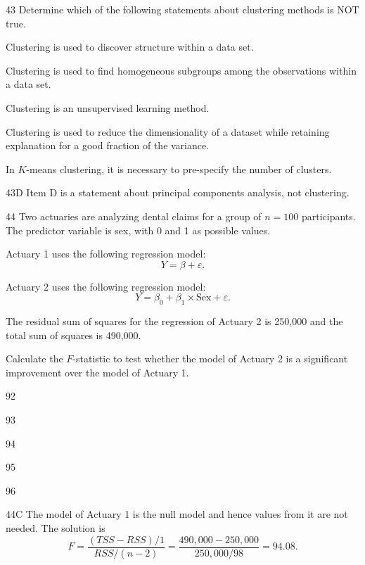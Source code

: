 \begin{question}{43}
Determine which of the following statements about clustering methods is NOT true.

\begin{choices}
\item Clustering is used to discover structure within a data set.
\item Clustering is used to find homogeneous subgroups among the observations within a data set.
\item Clustering is an unsupervised learning method.
\item Clustering is used to reduce the dimensionality of a dataset while retaining explanation for a good fraction of the variance.
\item In $K$-means clustering, it is necessary to pre-specify the number of clusters.
\end{choices}
\end{question}
\begin{solution}{43}{D}
Item D is a statement about principal components analysis, not clustering.
\end{solution}

\begin{question}{44}
Two actuaries are analyzing dental claims for a group of $n = 100$ participants. The predictor variable is sex, with 0 and 1 as possible values.

Actuary 1 uses the following regression model:
\[ Y = \beta + \varepsilon. \]

Actuary 2 uses the following regression model:
\[ Y = \beta_0 + \beta_1 \times \mathrm{Sex} + \varepsilon. \]

The residual sum of squares for the regression of Actuary 2 is 250,000 and the total sum of squares is 490,000.

Calculate the $F$-statistic to test whether the model of Actuary 2 is a significant improvement over the model of Actuary 1.

\begin{choices}
\item 92
\item 93
\item 94
\item 95
\item 96
\end{choices}
\end{question}
\begin{solution}{44}{C}
The model of Actuary 1 is the null model and hence values from it are not needed. The solution is
\[ F = \frac{(TSS - RSS)/1}{RSS/(n-2)} = \frac{490{,}000 - 250{,}000}{250{,}000/98} = 94.08. \]
\end{solution}

